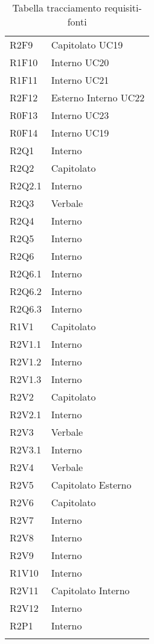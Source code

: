 \begin{center}
\begin{longtable}{  p{5cm} p{5cm} }
		R2F9 & Capitolato \newline UC19 \\
		R1F10 & Interno \newline UC20 \\
		R1F11 & Interno \newline UC21 \\
		R2F12 & Esterno \newline Interno \newline UC22 \\
		R0F13 & Interno \newline UC23 \\
		R0F14 & Interno \newline UC19 \\
		R2Q1 & Interno \\
		R2Q2 & Capitolato \\
		R2Q2.1 & Interno \\
		R2Q3 & Verbale \\
		R2Q4 & Interno \\
		R2Q5 & Interno \\
		R2Q6 & Interno \\
		R2Q6.1 & Interno \\
		R2Q6.2 & Interno \\
		R2Q6.3 & Interno \\
		R1V1 & Capitolato \\
		R2V1.1 & Interno \\
		R2V1.2 & Interno \\
		R2V1.3 & Interno \\
		R2V2 & Capitolato \\
		R2V2.1 & Interno \\
		R2V3 & Verbale \\
		R2V3.1 & Interno \\
		R2V4 & Verbale \\
		R2V5 & Capitolato \newline Esterno \\
		R2V6 & Capitolato \\
		R2V7 & Interno \\
		R2V8 & Interno \\
		R2V9 & Interno \\
		R1V10 & Interno \\
		R2V11 & Capitolato \newline Interno \\
		R2V12 & Interno \\		
		R2P1 & Interno \\
		\rowcolor{white}
	\caption{Tabella tracciamento requisiti-fonti}
	\end{longtable}
\end{center}

